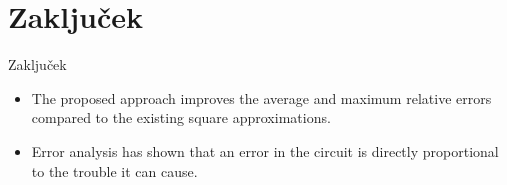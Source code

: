 \documentclass[xcolor=dvipsnames,compress]{beamer}
\begin{document}
\section{Zaključek}
\label{sec:zakljucek}

\begin{frame}{Zaključek}
\begin{itemize}
	\item The proposed approach improves the average and maximum relative errors compared to the existing square approximations.
	\pause
	\item Error analysis has shown that an error in the circuit is directly proportional to the trouble it can cause.
\end{itemize}
\end{frame}
\end{document}
